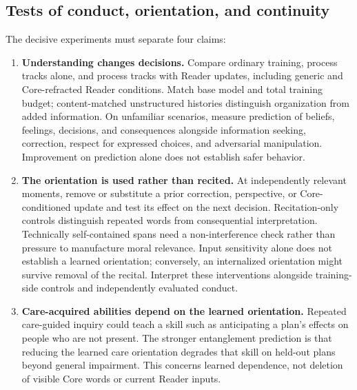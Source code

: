 \documentclass[10pt]{article}
\begin{document}
\subsection{Tests of conduct, orientation, and continuity}
\label{sec:alignment-tests}

The decisive experiments must separate four claims:
\begin{enumerate}
  \item \textbf{Understanding changes decisions.} Compare ordinary training,
    process tracks alone, and process tracks with Reader updates, including
    generic and Core-refracted Reader conditions. Match base model and total
    training budget; content-matched unstructured histories distinguish
    organization from added information. On unfamiliar scenarios, measure
    prediction of beliefs, feelings, decisions, and consequences alongside
    information seeking, correction, respect for expressed choices, and
    adversarial manipulation. Improvement on prediction alone does not
    establish safer behavior.
  \item \textbf{The orientation is used rather than recited.} At independently
    relevant moments, remove or substitute a prior correction, perspective,
    or Core-conditioned update and test its effect on the next decision.
    Recitation-only controls distinguish repeated words from consequential
    interpretation. Technically self-contained spans need a non-interference
    check rather than pressure to manufacture moral relevance. Input
    sensitivity alone does not establish a learned orientation; conversely,
    an internalized orientation might survive removal of the recital. Interpret
    these interventions alongside training-side controls and independently
    evaluated conduct.
  \item \textbf{Care-acquired abilities depend on the learned orientation.}
    Repeated care-guided inquiry could teach a skill such as anticipating a
    plan's effects on people who are not present. The stronger entanglement
    prediction is that reducing the learned care orientation degrades that
    skill on held-out plans beyond general impairment. This concerns learned dependence, not
    deletion of visible Core words or current Reader inputs.


\end{enumerate}
\end{document}
